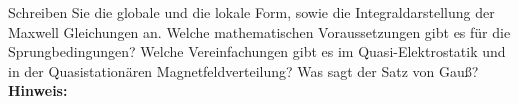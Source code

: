 \begin{question}[section=2,subsection=21,name={Maxwell Gleichungen},difficulty=4,type=mdl,mode=exm,tags={}]
	Schreiben Sie die globale und die lokale Form, sowie die Integraldarstellung der Maxwell Gleichungen an. Welche mathematischen Voraussetzungen gibt es für die Sprungbedingungen? Welche Vereinfachungen gibt es im Quasi-Elektrostatik und in der Quasistationären Magnetfeldverteilung? Was sagt der Satz von Gauß?
	\\ \textbf{Hinweis:}\\
	
\end{question}
\begin{solution}
	
\end{solution}